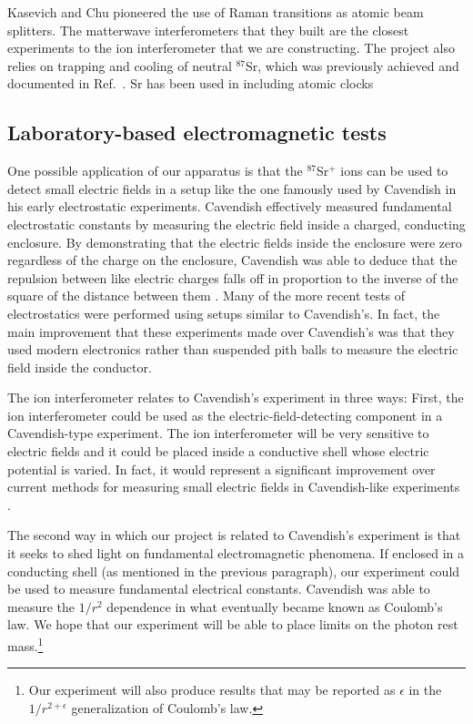 Kasevich and Chu pioneered the use of Raman transitions as atomic beam splitters\cite{kasevichChu1991}. The matterwave interferometers that they built are the closest experiments to the ion interferometer that we are constructing. The project also relies on trapping and cooling of neutral $^{87}$Sr, which was previously achieved and documented in Ref.~\cite{kurosu_trap_sr}. Sr has been used in including atomic clocks \cite{ludlow_science}


\subsection{Laboratory-based electromagnetic tests}

One possible application of our apparatus is that the $^{87}$Sr$^+$ ions can be used to detect small electric fields in a setup like the one famously used by Cavendish in his early electrostatic experiments. Cavendish effectively measured fundamental electrostatic constants by measuring the electric field inside a charged, conducting enclosure. By demonstrating that the electric fields inside the enclosure were zero regardless of the charge on the enclosure, Cavendish was able to deduce that the repulsion between like electric charges falls off in proportion to the inverse of the square of the distance between them \cite{geodude}. Many of the more recent tests of electrostatics were performed using setups similar to Cavendish's\cite{jackson}.  In fact, the main improvement that these experiments made over Cavendish's was that they used modern electronics rather than suspended pith balls to measure the electric field inside the conductor.

The ion interferometer relates to Cavendish's experiment in three ways: First, the ion interferometer could be used as the electric-field-detecting component in a Cavendish-type experiment. The ion interferometer will be very sensitive to electric fields and it could be placed inside a conductive shell whose electric potential is varied. In fact, it would represent a significant improvement over current methods for measuring small electric fields in Cavendish-like experiments \cite{NSFprop}. 

The second way in which our project is related to Cavendish's experiment is that it seeks to shed light on fundamental electromagnetic phenomena. If enclosed in a conducting shell (as mentioned in the previous paragraph), our experiment could be used to measure fundamental electrical constants. Cavendish was able to measure the $1/r^2$ dependence in what eventually became known as Coulomb's law. We hope that our experiment will be able to place limits on the photon rest mass.\footnote{Our experiment will also produce results that may be reported as $\epsilon$ in the $1/r^{2+\epsilon}$ generalization of Coulomb's law.}

